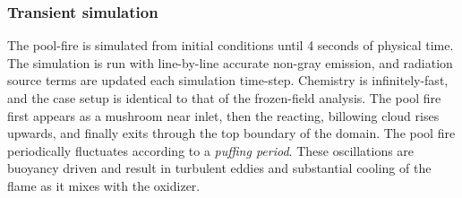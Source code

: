 



\subsubsection{Transient simulation}
The pool-fire is simulated from initial conditions until 4 seconds of physical time.
The simulation is run with line-by-line accurate non-gray emission, and radiation source terms are updated each simulation time-step. Chemistry is infinitely-fast, and the case setup is identical to that of the frozen-field analysis.
The pool fire first appears as a mushroom near inlet, then the reacting, billowing cloud rises upwards, and finally exits through the top boundary of the domain.
The pool fire periodically fluctuates according to a \textit{puffing period}. These oscillations are buoyancy driven and result in turbulent eddies and substantial cooling of the flame as it mixes with the oxidizer.


